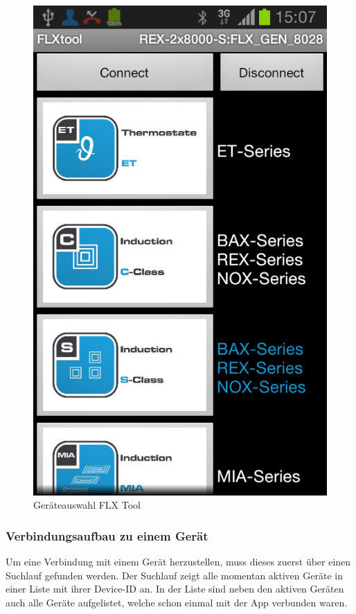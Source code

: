 \begin{figure}
	\includegraphics[scale=0.3]{analysis/res/SelectDevice}
	\caption{Geräteauswahl FLX Tool}
\end{figure}

\subsubsection{Verbindungsaufbau zu einem Gerät}
\label{subsubsec:Verbindungsaufbau zu einem Gerät}

Um eine Verbindung mit einem Gerät herzustellen, muss dieses zuerst über einen Suchlauf gefunden werden. Der Suchlauf zeigt alle momentan aktiven Geräte in einer Liste mit ihrer Device-ID an. In der Liste sind neben den aktiven Geräten auch alle Geräte aufgelistet, welche schon einmal mit der App verbunden waren.


